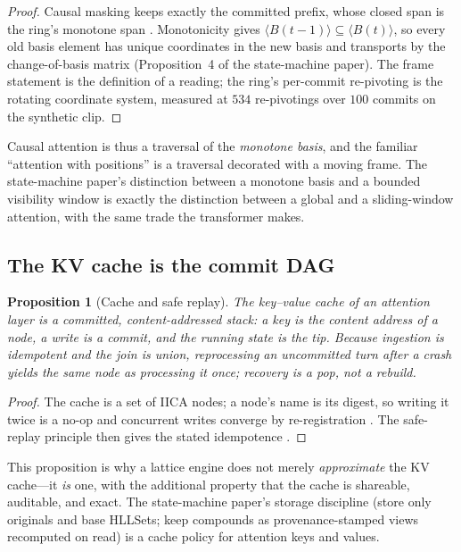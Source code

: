 \documentclass[11pt,a4paper]{article}
\newtheorem{proposition}[principle]{Proposition}
\theoremstyle{remark}
\newcommand{\spanof}[1]{\ensuremath{\langle #1\rangle}}%
\begin{document}
\begin{proof}
Causal masking keeps exactly the committed prefix, whose closed span is the
ring's monotone span \cite{state2026}. Monotonicity gives
$\spanof{B(t{-}1)}\subseteq\spanof{B(t)}$, so every old basis element has unique
coordinates in the new basis and transports by the change-of-basis matrix
(Proposition~4 of the state-machine paper). The frame statement is the
definition of a reading; the ring's per-commit re-pivoting is the rotating
coordinate system, measured at $534$ re-pivotings over $100$ commits on the
synthetic clip.
\end{proof}

Causal attention is thus a traversal of the \emph{monotone basis}, and the
familiar ``attention with positions'' is a traversal decorated with a moving
frame. The state-machine paper's distinction between a monotone basis and a
bounded visibility window is exactly the distinction between a global and a
sliding-window attention, with the same trade the transformer makes.

\subsection{The KV cache is the commit DAG}

\begin{proposition}[Cache and safe replay]
\label{prop:kv}
The key--value cache of an attention layer is a committed, content-addressed
stack: a key is the content address of a node, a write is a commit, and the
running state is the tip. Because ingestion is idempotent and the join is
union, reprocessing an uncommitted turn after a crash yields the same node as
processing it once; recovery is a pop, not a rebuild.
\end{proposition}

\begin{proof}
The cache is a set of IICA nodes; a node's name is its digest, so writing it
twice is a no-op and concurrent writes converge by re-registration
\cite{companion2026}. The safe-replay principle then gives the stated
idempotence \cite{state2026}.
\end{proof}

This proposition is why a lattice engine does not merely \emph{approximate} the
KV cache---it \emph{is} one, with the additional property that the cache is
shareable, auditable, and exact. The state-machine paper's storage discipline
(store only originals and base HLLSets; keep compounds as provenance-stamped
views recomputed on read) is a cache policy for attention keys and values.
\end{document}
